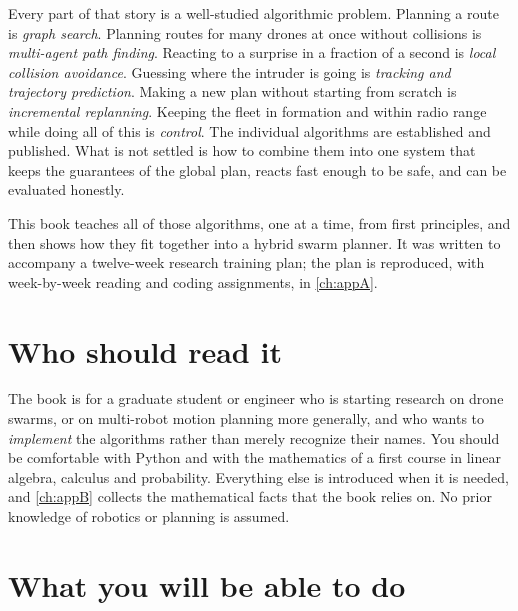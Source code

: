 Every part of that story is a well-studied algorithmic problem. Planning a route is
\emph{graph search}. Planning routes for many drones at once without collisions is
\emph{multi-agent path finding}. Reacting to a surprise in a fraction of a second is
\emph{local collision avoidance}. Guessing where the intruder is going is
\emph{tracking and trajectory prediction}. Making a new plan without starting from
scratch is \emph{incremental replanning}. Keeping the fleet in formation and within
radio range while doing all of this is \emph{control}. The individual algorithms are
established and published. What is not settled is how to combine them into one system
that keeps the guarantees of the global plan, reacts fast enough to be safe, and can be
evaluated honestly.

This book teaches all of those algorithms, one at a time, from first principles, and
then shows how they fit together into a hybrid swarm planner. It was written to
accompany a twelve-week research training plan; the plan is reproduced, with
week-by-week reading and coding assignments, in \cref{ch:appA}.

\section*{Who should read it}

The book is for a graduate student or engineer who is starting research on drone
swarms, or on multi-robot motion planning more generally, and who wants to
\emph{implement} the algorithms rather than merely recognize their names. You should be
comfortable with Python and with the mathematics of a first course in linear algebra,
calculus and probability. Everything else is introduced when it is needed, and
\cref{ch:appB} collects the mathematical facts that the book relies on. No prior
knowledge of robotics or planning is assumed.

\section*{What you will be able to do}

